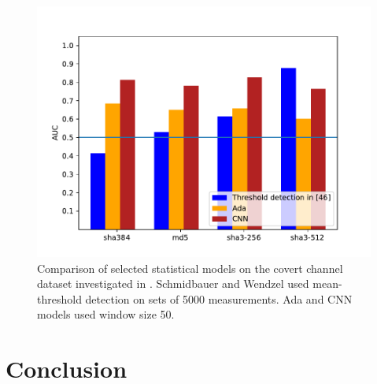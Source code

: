\documentclass[12pt,a4paper,automark, toc=bib]{scrreprt}
\theoremstyle{definition}
\begin{document}
			\begin{figure}
				\centering
				\includegraphics[width=0.75\linewidth]{figures/native.pdf}
				\caption{Comparison of selected statistical models on the covert channel dataset investigated in \cite{Schmidbauer}. Schmidbauer and Wendzel used mean-threshold detection on sets of 5000 measurements. Ada and CNN models used window size 50.}
				\label{Schm-perf}
			\end{figure}
		
		
	\chapter{Conclusion}
	
\end{document}
